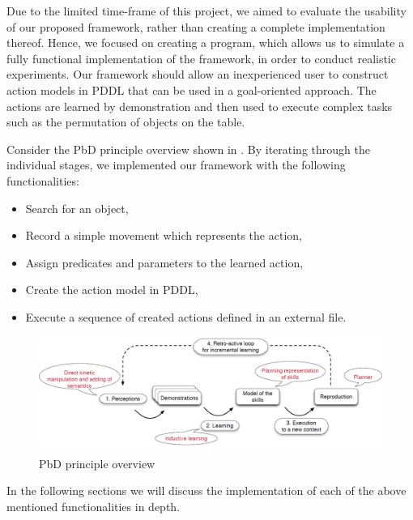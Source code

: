 Due to the limited time-frame of this project, we aimed to evaluate the usability of our proposed framework, rather than creating a complete implementation thereof.
Hence, we focused on creating a program, which allows us to simulate a fully functional implementation of the framework, in order to conduct realistic experiments.
Our framework should allow an inexperienced user to construct action models in PDDL that can be used in a goal-oriented approach.
The actions are learned by demonstration and then used to execute complex tasks such as the permutation of objects on the table.

Consider the PbD principle overview shown in .
By iterating through the individual stages, we implemented our framework with the following functionalities:
\begin{itemize}
\item Search for an object,
\item Record a simple movement which represents the action,
\item Assign predicates and parameters to the learned action,
\item Create the action model in PDDL,
\item Execute a sequence of created actions defined in an external file.
\end{itemize}

  \begin{figure}[ht]
    \centering
    \includegraphics[scale=0.45]{figures/Baxter-Case-Study}
    \caption{PbD principle overview}
    \label{fig:Baxter-Case-Study}
  \end{figure}

In the following sections we will discuss the implementation of each of the above mentioned functionalities in depth.


